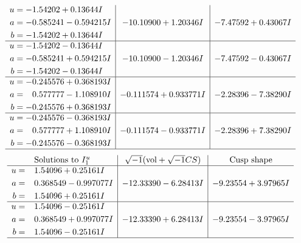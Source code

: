 \documentclass[1p]{elsarticle_modified}
\theoremstyle{definition}
\newcommand{\I}{\sqrt{-1}}
\begin{document}
$$\begin{array}{c|c|c}
\begin{aligned}
u &= -1.54202 + 0.13644 I \\
a &= -0.585241 - 0.594215 I \\
b &= -1.54202 + 0.13644 I\end{aligned}
 & -10.10900 + 1.20346 I & -7.47592 + 0.43067 I \\ \hline\begin{aligned}
u &= -1.54202 - 0.13644 I \\
a &= -0.585241 + 0.594215 I \\
b &= -1.54202 - 0.13644 I\end{aligned}
 & -10.10900 - 1.20346 I & -7.47592 - 0.43067 I \\ \hline\begin{aligned}
u &= -0.245576 + 0.368193 I \\
a &= \phantom{-}0.577777 - 1.108910 I \\
b &= -0.245576 + 0.368193 I\end{aligned}
 & -0.111574 + 0.933771 I & -2.28396 - 7.38290 I \\ \hline\begin{aligned}
u &= -0.245576 - 0.368193 I \\
a &= \phantom{-}0.577777 + 1.108910 I \\
b &= -0.245576 - 0.368193 I\end{aligned}
 & -0.111574 - 0.933771 I & -2.28396 + 7.38290 I\\
 \hline 
 \end{array}$$\newpage$$\begin{array}{c|c|c}  
\text{Solutions to }I^u_{1}& \I (\text{vol} + \sqrt{-1}CS) & \text{Cusp shape}\\
 \hline 
\begin{aligned}
u &= \phantom{-}1.54096 + 0.25161 I \\
a &= \phantom{-}0.368549 - 0.997077 I \\
b &= \phantom{-}1.54096 + 0.25161 I\end{aligned}
 & -12.33390 - 6.28413 I & -9.23554 + 3.97965 I \\ \hline\begin{aligned}
u &= \phantom{-}1.54096 - 0.25161 I \\
a &= \phantom{-}0.368549 + 0.997077 I \\
b &= \phantom{-}1.54096 - 0.25161 I\end{aligned}
 & -12.33390 + 6.28413 I & -9.23554 - 3.97965 I\\
 \hline 
 \end{array}$$\newpage\newpage\renewcommand{\arraystretch}{1}
\end{document}
